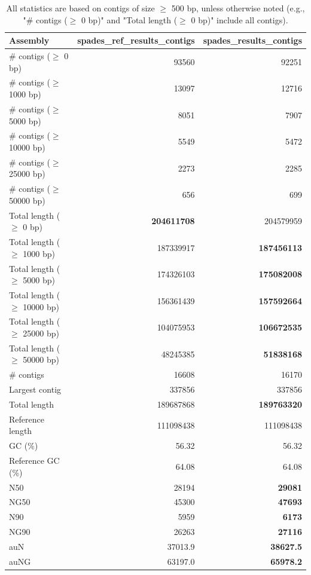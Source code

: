 \documentclass[12pt,a4paper]{article}
\begin{document}
\begin{table}[ht]
\begin{center}
\caption{All statistics are based on contigs of size $\geq$ 500 bp, unless otherwise noted (e.g., "\# contigs ($\geq$ 0 bp)" and "Total length ($\geq$ 0 bp)" include all contigs).}
\begin{tabular}{|l*{2}{|r}|}
\hline
Assembly & spades\_ref\_results\_contigs & spades\_results\_contigs \\ \hline
\# contigs ($\geq$ 0 bp) & 93560 & 92251 \\ \hline
\# contigs ($\geq$ 1000 bp) & 13097 & 12716 \\ \hline
\# contigs ($\geq$ 5000 bp) & 8051 & 7907 \\ \hline
\# contigs ($\geq$ 10000 bp) & 5549 & 5472 \\ \hline
\# contigs ($\geq$ 25000 bp) & 2273 & 2285 \\ \hline
\# contigs ($\geq$ 50000 bp) & 656 & 699 \\ \hline
Total length ($\geq$ 0 bp) & {\bf 204611708} & 204579959 \\ \hline
Total length ($\geq$ 1000 bp) & 187339917 & {\bf 187456113} \\ \hline
Total length ($\geq$ 5000 bp) & 174326103 & {\bf 175082008} \\ \hline
Total length ($\geq$ 10000 bp) & 156361439 & {\bf 157592664} \\ \hline
Total length ($\geq$ 25000 bp) & 104075953 & {\bf 106672535} \\ \hline
Total length ($\geq$ 50000 bp) & 48245385 & {\bf 51838168} \\ \hline
\# contigs & 16608 & 16170 \\ \hline
Largest contig & 337856 & 337856 \\ \hline
Total length & 189687868 & {\bf 189763320} \\ \hline
Reference length & 111098438 & 111098438 \\ \hline
GC (\%) & 56.32 & 56.32 \\ \hline
Reference GC (\%) & 64.08 & 64.08 \\ \hline
N50 & 28194 & {\bf 29081} \\ \hline
NG50 & 45300 & {\bf 47693} \\ \hline
N90 & 5959 & {\bf 6173} \\ \hline
NG90 & 26263 & {\bf 27116} \\ \hline
auN & 37013.9 & {\bf 38627.5} \\ \hline
auNG & 63197.0 & {\bf 65978.2} \\ \hline

\end{tabular}
\end{center}
\end{table}
\end{document}
